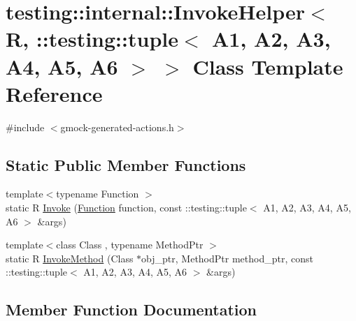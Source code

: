 \hypertarget{classtesting_1_1internal_1_1_invoke_helper_3_01_r_00_01_1_1testing_1_1tuple_3_01_a1_00_01_a2_00_5653fefa261cff106ebaaf9c78f6ee42}{}\section{testing\+::internal\+::Invoke\+Helper$<$ R, \+::testing\+::tuple$<$ A1, A2, A3, A4, A5, A6 $>$ $>$ Class Template Reference}
\label{classtesting_1_1internal_1_1_invoke_helper_3_01_r_00_01_1_1testing_1_1tuple_3_01_a1_00_01_a2_00_5653fefa261cff106ebaaf9c78f6ee42}


{\ttfamily \#include $<$gmock-\/generated-\/actions.\+h$>$}

\subsection*{Static Public Member Functions}
\begin{DoxyCompactItemize}
\item 
{\footnotesize template$<$typename Function $>$ }\\static R \mbox{\hyperlink{classtesting_1_1internal_1_1_invoke_helper_3_01_r_00_01_1_1testing_1_1tuple_3_01_a1_00_01_a2_00_5653fefa261cff106ebaaf9c78f6ee42_abd80fc3954d529303e56f4410db782fc}{Invoke}} (\mbox{\hyperlink{structtesting_1_1internal_1_1_function}{Function}} function, const \+::testing\+::tuple$<$ A1, A2, A3, A4, A5, A6 $>$ \&args)
\item 
{\footnotesize template$<$class Class , typename Method\+Ptr $>$ }\\static R \mbox{\hyperlink{classtesting_1_1internal_1_1_invoke_helper_3_01_r_00_01_1_1testing_1_1tuple_3_01_a1_00_01_a2_00_5653fefa261cff106ebaaf9c78f6ee42_aecdf0f71f5b2c0441b066f62e936805e}{Invoke\+Method}} (Class $\ast$obj\+\_\+ptr, Method\+Ptr method\+\_\+ptr, const \+::testing\+::tuple$<$ A1, A2, A3, A4, A5, A6 $>$ \&args)
\end{DoxyCompactItemize}


\subsection{Member Function Documentation}
\mbox{\label{classtesting_1_1internal_1_1_invoke_helper_3_01_r_00_01_1_1testing_1_1tuple_3_01_a1_00_01_a2_00_5653fefa261cff106ebaaf9c78f6ee42_abd80fc3954d529303e56f4410db782fc}} 
